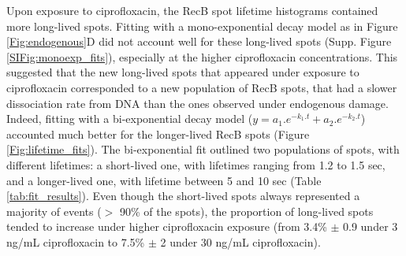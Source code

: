 Upon exposure to ciprofloxacin, the RecB spot lifetime histograms contained more long-lived spots. Fitting with a mono-exponential decay model as in Figure \ref{Fig:endogenous}D did not account well for these long-lived spots (Supp. Figure \ref{SIFig:monoexp_fits}), especially at the higher ciprofloxacin concentrations. This suggested that the new long-lived spots that appeared under exposure to ciprofloxacin corresponded to a new population of RecB spots, that had a slower dissociation rate from DNA than the ones observed under endogenous damage. Indeed, fitting with a bi-exponential decay model ($y = a_1.e^{-k_1.t} + a_2.e^{-k_2.t}$) accounted much better for the longer-lived RecB spots (Figure \ref{Fig:lifetime_fits}). The bi-exponential fit outlined two populations of spots, with different lifetimes: a short-lived one, with lifetimes ranging from 1.2 to 1.5 sec, and a longer-lived one, with lifetime between 5 and 10 sec (Table \ref{tab:fit_results}). Even though the short-lived spots always represented a majority of events ($>$ 90\% of the spots), the proportion of long-lived spots tended to increase under higher ciprofloxacin exposure (from 3.4\% $\pm$ 0.9 under 3 ng/mL ciprofloxacin to 7.5\% $\pm$ 2 under 30 ng/mL ciprofloxacin).

